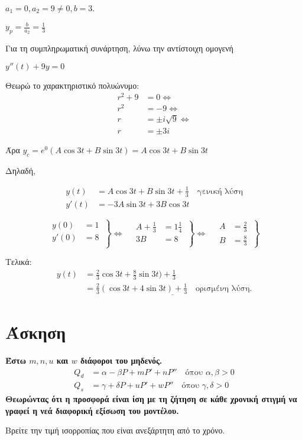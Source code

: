 \documentclass[a4paper,12pt]{article}
\begin{document}
\begin{description}
$a_1=0, a_2=9\neq 0, b=3$.

$y_p=\frac{b}{a_2}=\frac{1}{3}$

Για τη συμπληρωματική συνάρτηση, λύνω την αντίστοιχη ομογενή

$y''(t)+9y = 0$

Θεωρώ το χαρακτηριστικό πολυώνυμο:
\begin{align*}
r^2+9&=0 \Leftrightarrow \\
r^2&=-9 \Leftrightarrow \\
r&=\pm i\sqrt{9} \Leftrightarrow \\
r&=\pm 3i
\end{align*}

Άρα $y_c=e^{0}(A\cos 3t +B\sin 3t) = A\cos 3t +B\sin 3t$

Δηλαδή,

\begin{align*}
y(t) &= A\cos 3t +B\sin 3t + \frac{1}{3} \quad \text{γενική λύση} \\
y'(t) &= -3A\sin 3t +3B\cos 3t
\end{align*}

\[
  \left.\begin{aligned}
y(0)&=1 \\
y'(0)&=8\\
  \end{aligned}\:\right\}\Leftrightarrow \quad
 \left.\begin{aligned}
A+\frac{1}{3}&=1\frac{1}{4}\\
3B&=8\\
  \end{aligned}\:\right\}\Leftrightarrow \quad
 \left.\begin{aligned}
A&=\frac{2}{3}\\
B&=\frac{8}{3}
  \end{aligned}\:\right\}
\]


Τελικά: \begin{align*}y(t) &= \frac{2}{3}\cos 3t +\frac{8}{3}\sin 3t) + \frac{1}{3}\\ &= \underline{\frac{2}{3}(\cos 3t +4\sin 3t) + \frac{1}{3}\quad \text{ορισμένη λύση}}.\end{align*}
\end{description}

\vspace{2\baselineskip}

\section{Άσκηση} {\bfseries Έστω $m,n,u$ και $w$ διάφοροι του μηδενός.
\begin{align*}
Q_d&=\alpha -\beta P +mP' +nP'' \quad\text{όπου $\alpha,\beta >0$}\\
Q_s&=\gamma +\delta P +uP'+wP'' \quad\text{όπου $\gamma,\delta >0$}
\end{align*}
Θεωρώντας ότι η προσφορά είναι ίση με τη ζήτηση σε κάθε χρονική στιγμή να γραφεί η νεά διαφορική εξίσωση του μοντέλου.

Βρείτε την τιμή ισορροπίας που είναι ανεξάρτητη από το χρόνο.}
\end{document}
